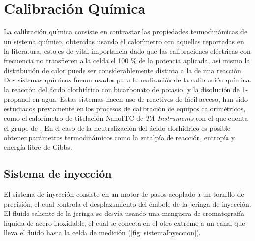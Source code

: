 
%




\chapter{Calibraci\'on Qu\'imica}\label{ch: chemical}
	La calibraci\'on qu\'imica consiste en contrastar las propiedades termodin\'amicas de un sistema qu\'imico, obtenidas usando el calor\'imetro con aquellas reportadas en la literatura, esto es de vital importancia dado que las calibraciones el\'ectricas con frecuencia no transfieren a la celda el 100 \% de la potencia aplicada, as\'i mismo la distribuci\'on de calor puede ser considerablemente distinta a la de una reacci\'on. Dos sistemas qu\'imicos fueron usados para la realizaci\'on de la calibraci\'on qu\'imica: la reacci\'on del \'acido clorhidrico con bicarbonato de potasio, y la disoluci\'on de 1-propanol en agua. Estas sistemas hacen uso de reactivos de f\'acil acceso, han sido estudiados previamente en los procesos de calibraci\'on de equipos calorim\'etricos, como el calor\'imetro de titulaci\'on NanoITC de \textit{TA Instruments} con el que cuenta el grupo de \groupname{} \cite{demarse2011calibration, adao2012chemical, nanoitc}. En el caso de la neutralizaci\'on del \'acido clorh\'idrico es posible obtener par\'ametros termodin\'amicos como la entalp\'ia de reacci\'on, entrop\'ia y energ\'ia libre de Gibbs.

\section{Sistema de inyecci\'on}
	El sistema de inyecci\'on consiste en un motor de pasos acoplado a un tornillo de precisión, el cual controla el desplazamiento del émbolo de la jeringa de inyección. El fluido saliente de la jeringa se desvía usando una manguera de cromatografía líquida de acero inoxidable, el cual se conecta en el otro extremo a un canal que lleva el fluido hasta la celda de medición (\autoref{fig: sistemaInyeccion}).
	

